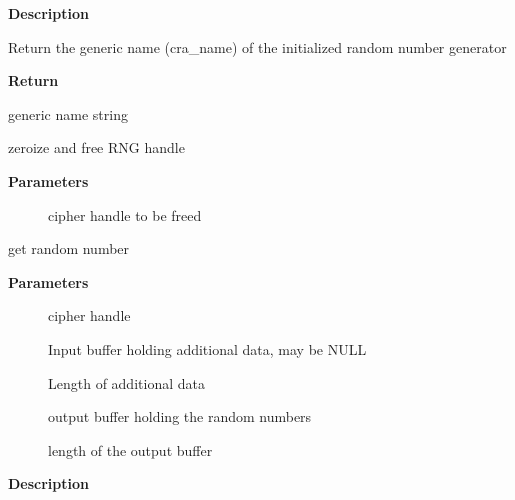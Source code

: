 \documentclass[a4paper,8pt,english]{sphinxmanual}
\begin{document}
\textbf{Description}

Return the generic name (cra\_name) of the initialized random number generator

\textbf{Return}

generic name string

\begin{fulllineitems}
\label{crypto/api-rng:c.crypto_free_rng}
zeroize and free RNG handle

\end{fulllineitems}


\textbf{Parameters}
\begin{description}
\item[{}] \leavevmode
cipher handle to be freed

\end{description}

\begin{fulllineitems}
\label{crypto/api-rng:c.crypto_rng_generate}
get random number

\end{fulllineitems}


\textbf{Parameters}
\begin{description}
\item[{}] \leavevmode
cipher handle

\item[{}] \leavevmode
Input buffer holding additional data, may be NULL

\item[{}] \leavevmode
Length of additional data

\item[{}] \leavevmode
output buffer holding the random numbers

\item[{}] \leavevmode
length of the output buffer

\end{description}

\textbf{Description}
\end{document}
